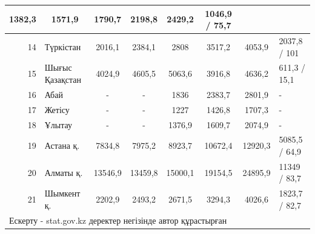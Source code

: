 \begin{table}[H]
{\begin{tabular}{|rlcccccl|}
    \multicolumn{1}{c|}{1382,3} &
    \multicolumn{1}{c|}{1571,9} &
    \multicolumn{1}{c|}{1790,7} &
    \multicolumn{1}{c|}{2198,8} &
    \multicolumn{1}{c|}{2429,2} &
    1046,9 / 75,7 \\ \hline
  \multicolumn{1}{|r|}{14} &
    \multicolumn{1}{l|}{Түркістан} &
    \multicolumn{1}{c|}{2016,1} &
    \multicolumn{1}{c|}{2384,1} &
    \multicolumn{1}{c|}{2808} &
    \multicolumn{1}{c|}{3517,2} &
    \multicolumn{1}{c|}{4053,9} &
    2037,8 / 101 \\ \hline
  \multicolumn{1}{|r|}{15} &
    \multicolumn{1}{l|}{Шығыс Қазақстан} &
    \multicolumn{1}{c|}{4024,9} &
    \multicolumn{1}{c|}{4605,5} &
    \multicolumn{1}{c|}{5063,6} &
    \multicolumn{1}{c|}{3916,8} &
    \multicolumn{1}{c|}{4636,2} &
    611,3 / 15,1 \\ \hline
  \multicolumn{1}{|r|}{16} &
    \multicolumn{1}{l|}{Абай} &
    \multicolumn{1}{c|}{-} &
    \multicolumn{1}{c|}{-} &
    \multicolumn{1}{c|}{1836} &
    \multicolumn{1}{c|}{2383,7} &
    \multicolumn{1}{c|}{2801,9} &
    - \\ \hline
  \multicolumn{1}{|r|}{17} &
    \multicolumn{1}{l|}{Жетісу} &
    \multicolumn{1}{c|}{-} &
    \multicolumn{1}{c|}{-} &
    \multicolumn{1}{c|}{1227} &
    \multicolumn{1}{c|}{1426,8} &
    \multicolumn{1}{c|}{1707,3} &
    - \\ \hline
  \multicolumn{1}{|r|}{18} &
    \multicolumn{1}{l|}{Ұлытау} &
    \multicolumn{1}{c|}{-} &
    \multicolumn{1}{c|}{-} &
    \multicolumn{1}{c|}{1376,9} &
    \multicolumn{1}{c|}{1609,7} &
    \multicolumn{1}{c|}{2074,9} &
    - \\ \hline
  \multicolumn{1}{|r|}{19} &
    \multicolumn{1}{l|}{Астана қ.} &
    \multicolumn{1}{c|}{7834,8} &
    \multicolumn{1}{c|}{7975,2} &
    \multicolumn{1}{c|}{8923,7} &
    \multicolumn{1}{c|}{10672,4} &
    \multicolumn{1}{c|}{12920,3} &
    5085,5 / 64,9 \\ \hline
  \multicolumn{1}{|r|}{20} &
    \multicolumn{1}{l|}{Алматы қ.} &
    \multicolumn{1}{c|}{13546,9} &
    \multicolumn{1}{c|}{13459,8} &
    \multicolumn{1}{c|}{15000,1} &
    \multicolumn{1}{c|}{19154,5} &
    \multicolumn{1}{c|}{24895,9} &
    11349 / 83,7 \\ \hline
  \multicolumn{1}{|r|}{21} &
    \multicolumn{1}{l|}{Шымкент қ.} &
    \multicolumn{1}{c|}{2202,9} &
    \multicolumn{1}{c|}{2493,2} &
    \multicolumn{1}{c|}{2671,5} &
    \multicolumn{1}{c|}{3294,3} &
    \multicolumn{1}{c|}{4026,6} &
    1823,7 / 82,7 \\ \hline
  \multicolumn{8}{|l|}{Ескерту - stat.gov.kz деректер негізінде автор құрастырған} \\ \hline
  \end{tabular}%
  }
  \end{table}

